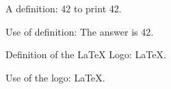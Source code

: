 
A definition: {\mktsStyleBold{}42} to print {\mktsStyleCode{}42}.\mktsShowpar\par
Use of definition: The answer is {\mktsStyleBold{}42}.\mktsShowpar\par
Definition of the LaTeX Logo:
\LaTeX{}.\mktsShowpar\par
Use of the logo: \LaTeX{}.\mktsShowpar\par


